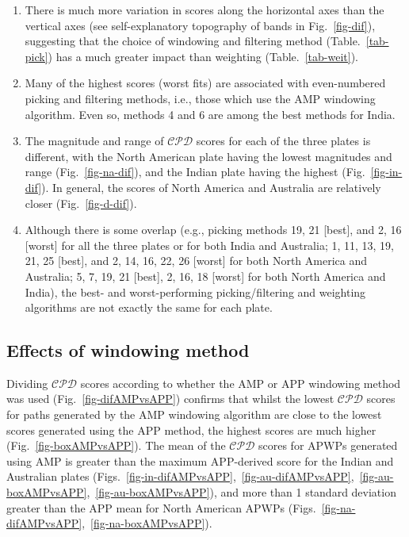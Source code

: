 \begin{enumerate}
  \item There is much more variation in scores along the horizontal axes than
	the vertical axes (see self-explanatory topography of bands in
	Fig.~\ref{fig-dif}), suggesting that the choice of windowing and filtering
	method (Table.~\ref{tab-pick}) has a much greater impact than weighting
	(Table.~\ref{tab-weit}).
  \item Many of the highest scores (worst fits) are associated with
	even-numbered picking and filtering methods, i.e., those which use the AMP
	windowing algorithm. Even so, methods 4 and 6 are among the best methods for
	India.
  \item The magnitude and range of $\mathcal{CPD}$ scores for each of the three
	plates is different, with the North American plate having the lowest
	magnitudes and range (Fig.~\ref{fig-na-dif}), and the Indian plate having
	the highest (Fig.~\ref{fig-in-dif}). In general, the scores of North America
	and Australia are relatively closer (Fig.~\ref{fig-d-dif}).
  \item Although there is some overlap (e.g., picking methods 19, 21 [best], and
	2, 16 [worst] for all the three plates or for both India and Australia; 1,
	11, 13, 19, 21, 25 [best], and 2, 14, 16, 22, 26 [worst] for both North
	America and Australia; 5, 7, 19, 21 [best], 2, 16, 18 [worst] for both North
	America and India), the best- and worst-performing picking/filtering and
	weighting algorithms are not exactly the same for each plate.
\end{enumerate}

\subsection{Effects of windowing method}

Dividing $\mathcal{CPD}$ scores according to whether the AMP or APP windowing
method was used (Fig.~\ref{fig-difAMPvsAPP}) confirms that whilst the lowest
$\mathcal{CPD}$ scores for paths generated by the AMP windowing algorithm are
close to the lowest scores generated using the APP method, the highest scores
are much higher (Fig.~\ref{fig-boxAMPvsAPP}). The mean of the $\mathcal{CPD}$
scores for APWPs generated using AMP is greater than the maximum APP-derived
score for the Indian and Australian plates
(Figs.~\ref{fig-in-difAMPvsAPP},~\ref{fig-au-difAMPvsAPP},~\ref{fig-au-boxAMPvsAPP},~\ref{fig-au-boxAMPvsAPP}),
and more than 1 standard deviation greater than the APP mean for North American
APWPs (Figs.~\ref{fig-na-difAMPvsAPP},~\ref{fig-na-boxAMPvsAPP}).

